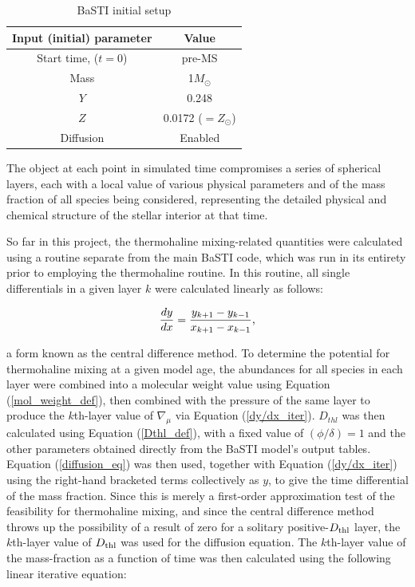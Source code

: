 \documentclass[12pt, a4paper]{report}
\begin{document}
\begin{table}
\begin{center}
\begin{tabular}{cc}
\hline
Input (initial) parameter & Value \\
\hline
Start time, ($t=0$) & pre-MS \\
Mass & 1$M_{\odot}$ \\
$Y$ & 0.248 \\
$Z$ & 0.0172 ($=Z_{\odot}$) \\
Diffusion & Enabled \\
\hline
\end{tabular}
\caption{BaSTI initial setup}
\label{basti_params}
\end{center}
\end{table}

The object at each point in simulated time compromises a series of spherical layers, each with a local value of various physical parameters and of the mass fraction of all species being considered, representing the detailed physical and chemical structure of the stellar interior at that time.

So far in this project, the thermohaline mixing-related quantities were calculated using a routine separate from the main BaSTI code, which was run in its entirety prior to employing the thermohaline routine. In this routine, all single differentials in a given layer $k$ were calculated linearly as follows:

\begin{equation}
\frac{dy}{dx} = \frac{y_{k+1} - y_{k-1}}{x_{k+1} - x_{k-1}} \textnormal{,}
\label{dy/dx_iter}
\end{equation}

a form known as the central difference method.
To determine the potential for thermohaline mixing at a given model age, the abundances for all species in each layer were combined into a molecular weight value using Equation (\ref{mol_weight_def}), then combined with the pressure of the same layer to produce the $k$th-layer value of $\nabla_{\mu}$ via Equation (\ref{dy/dx_iter}). $D_{thl}$ was then calculated using Equation (\ref{Dthl_def}), with a fixed value of $(\phi/\delta) = 1$ and the other parameters obtained directly from the BaSTI model's output tables. Equation (\ref{diffusion_eq}) was then used, together with Equation (\ref{dy/dx_iter}) using the right-hand bracketed terms collectively as $y$, to give the time differential of the mass fraction. Since this is merely a first-order approximation test of the feasibility for thermohaline mixing, and since the central difference method throws up the possibility of a result of zero for a solitary positive-$D_{\textnormal{thl}}$ layer, the $k$th-layer value of $D_{\textnormal{thl}}$ was used for the diffusion equation. The $k$th-layer value of the mass-fraction as a function of time was then calculated using the following linear iterative equation:
\end{document}
